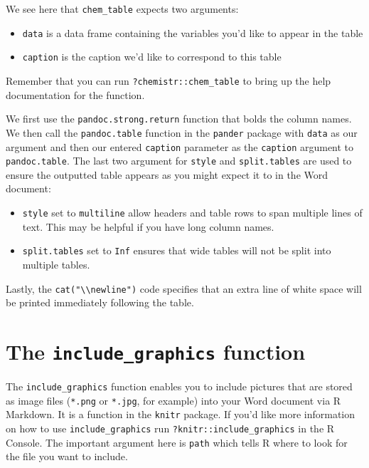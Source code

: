\documentclass[]{tufte-book}
\providecommand{\tightlist}{%
  \setlength{\itemsep}{0pt}\setlength{\parskip}{0pt}}
\begin{document}
We see here that \texttt{chem\_table} expects two arguments:

\begin{itemize}
\tightlist
\item
  \texttt{data} is a data frame containing the variables you'd like to
  appear in the table
\item
  \texttt{caption} is the caption we'd like to correspond to this table
\end{itemize}

Remember that you can run \texttt{?chemistr::chem\_table} to bring up
the help documentation for the function.

We first use the \texttt{pandoc.strong.return} function that bolds the
column names. We then call the \texttt{pandoc.table} function in the
\texttt{pander} package with \texttt{data} as our argument and then our
entered \texttt{caption} parameter as the \texttt{caption} argument to
\texttt{pandoc.table}. The last two argument for \texttt{style} and
\texttt{split.tables} are used to ensure the outputted table appears as
you might expect it to in the Word document:

\begin{itemize}
\item
  \texttt{style} set to \texttt{multiline} allow headers and table rows
  to span multiple lines of text. This may be helpful if you have long
  column names.
\item
  \texttt{split.tables} set to \texttt{Inf} ensures that wide tables
  will not be split into multiple tables.
\end{itemize}

Lastly, the \texttt{cat("\textbackslash{}\textbackslash{}newline")} code
specifies that an extra line of white space will be printed immediately
following the table.

\section{\texorpdfstring{The \texttt{include\_graphics}
function}{The include\_graphics function}}\label{the-include_graphics-function}

The \texttt{include\_graphics} function enables you to include pictures
that are stored as image files (\texttt{*.png} or \texttt{*.jpg}, for
example) into your Word document via R Markdown. It is a function in the
\texttt{knitr} package. If you'd like more information on how to use
\texttt{include\_graphics} run \texttt{?knitr::include\_graphics} in the
R Console. The important argument here is \texttt{path} which tells R
where to look for the file you want to include.
\end{document}
